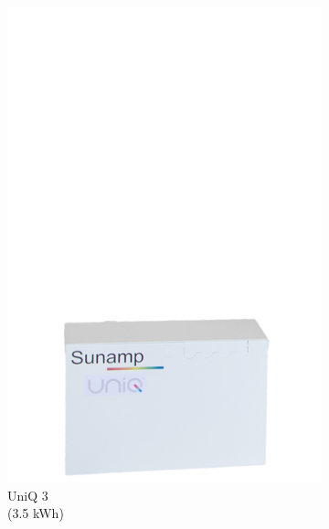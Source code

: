 \begin{figure}[htbp]
	\centering
	\begin{subfigure}{.24\textwidth}
		\centering
		\includegraphics[width=\textwidth]{figures/sunamp-uniq-3.png}
		\caption{UniQ 3\\
			(3.5 kWh)}
		\label{fig:uniq3}
	\end{subfigure}
	\begin{subfigure}{.24\textwidth}
		\centering

\end{subfigure}
\end{figure}
